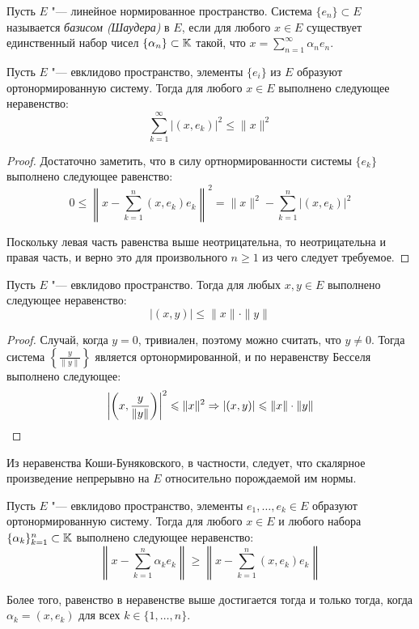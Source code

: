 \begin{definition}
	Пусть $E$ "--- линейное нормированное пространство. Система $\{e_n\} \subset E$ называется \textit{базисом (Шаудера)} в $E$, если для любого $x \in E$ существует единственный набор чисел $\{\alpha_n\} \subset \mathbb{K}$ такой, что 
    $x = \sum \limits_{n = 1}^{\infty} \alpha_n e_n$.
\end{definition}

\begin{proposition}
	Пусть $E$ "--- евклидово пространство, элементы 
    $\{e_i\}$ из $E$ образуют ортонормированную
    систему. Тогда для любого $x \in E$ выполнено следующее
    неравенство:
	\[\sum_{k = 1}^{\infty}|(x, e_k)|^2 \leqslant \|x\|^2\]
\end{proposition}

\begin{proof}
	Достаточно заметить, что в силу ортнормированности системы $\{e_k\}$ выполнено следующее равенство:
	\[ 0 \leqslant \left\|x - \sum_{k = 1}^n(x, e_k)e_k\right\|^2 = 
 \|x\|^2 - \sum_{k = 1}^{n}|(x, e_k)|^2\]

	Поскольку левая часть равенства выше неотрицательна, то неотрицательна и правая часть, и верно это для произвольного $n \geqslant 1$ из чего следует требуемое.
\end{proof}

\begin{corollary}
	Пусть $E$ "--- евклидово пространство. Тогда для любых $x, y \in E$ выполнено следующее неравенство:
	\[|(x, y)| \leqslant \|x\| \cdot \|y\|\]
\end{corollary}

\begin{proof}
	Случай, когда $y = 0$, тривиален, поэтому можно считать, что $y \neq 0$. Тогда система $\left\{\frac{y}{\|y\|}\right\}$ является ортонормированной, и по неравенству Бесселя выполнено следующее:
	\[\left|\left(x, \frac y{\|y\|}\right)\right|^2 \leqslant \|x\|^2 \Rightarrow |(x, y)| \leqslant \|x\| \cdot \|y\| \qedhere\]
\end{proof}

\begin{note}
	Из неравенства Коши-Буняковского, в частности, следует, что скалярное произведение непрерывно на $E$ относительно порождаемой им нормы.
\end{note}

\begin{proposition}\label{minproperty}
	Пусть $E$ "--- евклидово пространство, элементы $e_1, \dotsc, e_k \in E$ образуют ортонормированную систему. Тогда для любого $x \in E$ и любого набора $\{\alpha_k\}_{k = 1}^n \subset \mathbb{K}$ выполнено следующее неравенство:
	\[\left\|x - \sum_{k = 1}^n \alpha_ke_k\right\| \geqslant \left\|x - \sum_{k = 1}^n (x, e_k)e_k\right\|\]

	Более того, равенство в неравенстве выше достигается тогда и только тогда, когда $\alpha_k = (x, e_k)$ для всех $k \in \{1, \dotsc, n\}$.
\end{proposition}

